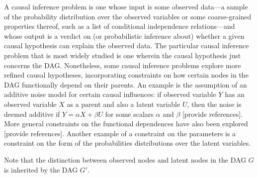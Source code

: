 A causal inference problem is one whose input is some observed data---a sample of the probability distribution over the observed variables or some coarse-grained properties thereof, such as a list of conditional independence relations---and whose output is a verdict on (or probabilistic inference about) whether a given causal hypothesis can explain the observed data.   The particular causal inference problem that is most widely studied is one wherein the causal hypothesis just concerns the DAG.  Nonetheless, some causal inference problems explore more refined causal hypotheses, incorporating constraints on how  certain nodes in the DAG functionally depend on their parents.  An example is the assumption of an additive noise model for certain causal influences: if observed variable $Y$ has an observed variable $X$ as a parent and also a latent variable $U$, then the noise is deemed additive if $Y=\alpha X + \beta U$ for some scalars $\alpha$ and $\beta$ [provide references].  More general constraints on the functional dependences have also been explored [provide references].  Another example of a constraint on the parameters is a constraint on the form of the probabilities distributions over the latent variables. 



Note that the distinction between observed nodes and latent nodes in the DAG $G$ is inherited by the DAG $G'$.


